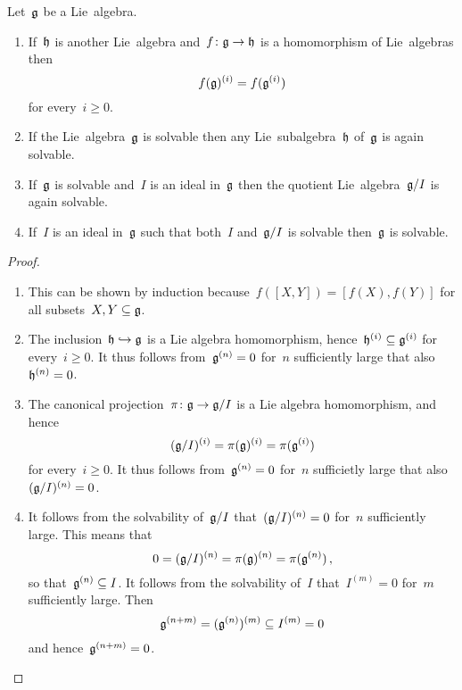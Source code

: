 \begin{proposition}
  \label{properties of solvable and nilpotent}
  Let~$\mathfrak{g}$ be a Lie~algebra.
  \begin{enumerate}
    \item
      If~$\mathfrak{h}$ is another Lie~algebra and~$f \colon \mathfrak{g} \to \mathfrak{h}$ is a homomorphism of Lie~algebras then
      \[
        f(\mathfrak{g})^{(i)}
        =
        f(\mathfrak{g}^{(i)})
      \]
      for every~$i \geq 0$.
    \item
      If the Lie~algebra~$\mathfrak{g}$ is solvable then any Lie~subalgebra~$\mathfrak{h}$ of~$\mathfrak{g}$ is again solvable.
    \item
      If~$\mathfrak{g}$ is solvable and~$I$ is an ideal in~$\mathfrak{g}$ then the quotient Lie~algebra~$\mathfrak{g}/I$ is again solvable.
    \item
      If~$I$ is an ideal in~$\mathfrak{g}$ such that both~$I$ and~$\mathfrak{g}/I$ is solvable then~$\mathfrak{g}$ is solvable.
  \end{enumerate}
\end{proposition}


\begin{proof}
  \leavevmode
  \begin{enumerate}
    \item
      This can be shown by induction because~$f([X,Y]) = [f(X), f(Y)]$ for all subsets~$X, Y \subseteq \mathfrak{g}$.
    \item
      The inclusion~$\mathfrak{h} \hookrightarrow \mathfrak{g}$ is a Lie algebra homomorphism, hence~$\mathfrak{h}^{(i)} \subseteq \mathfrak{g}^{(i)}$ for every~$i \geq 0$.
      It thus follows from~$\mathfrak{g}^{(n)} = 0$ for~$n$ sufficiently large that also~$\mathfrak{h}^{(n)} = 0$.
    \item
      The canonical projection~$\pi \colon \mathfrak{g} \to \mathfrak{g}/I$ is a Lie algebra homomorphism, and hence
      \[
        (\mathfrak{g}/I)^{(i)}
        =
        \pi(\mathfrak{g})^{(i)}
        =
        \pi(\mathfrak{g}^{(i)})
      \]
      for every~$i \geq 0$.
      It thus follows from~$\mathfrak{g}^{(n)} = 0$ for~$n$ sufficietly large that also~$(\mathfrak{g}/I)^{(n)} = 0$.
    \item
      It follows from the solvability of~$\mathfrak{g}/I$ that~$(\mathfrak{g}/I)^{(n)} = 0$ for~$n$ sufficiently large.
      This means that
      \[
        0
        =
        (\mathfrak{g}/I)^{(n)}
        =
        \pi(\mathfrak{g})^{(n)}
        =
        \pi(\mathfrak{g}^{(n)})  \,,
      \]
      so that~$\mathfrak{g}^{(n)} \subseteq I$.
      It follows from the solvability of~$I$ that~$I^{(m)} = 0$ for~$m$ sufficiently large.
      Then
      \[
        \mathfrak{g}^{(n+m)}
        =
        (\mathfrak{g}^{(n)})^{(m)}
        \subseteq
        I^{(m)}
        =
        0
      \]
      and hence~$\mathfrak{g}^{(n+m)} = 0$.
    \qedhere
  \end{enumerate}
\end{proof}


